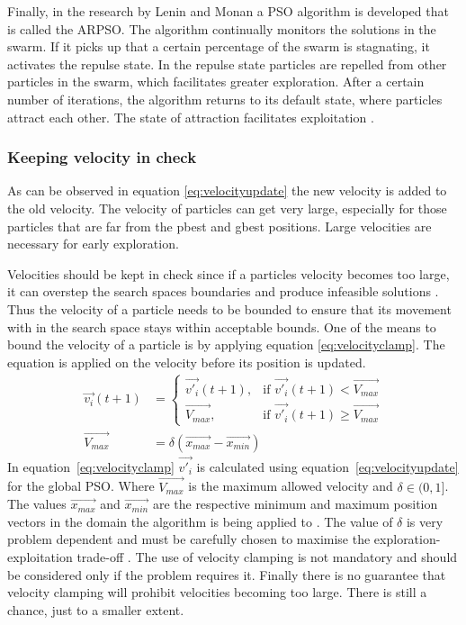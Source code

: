 Finally, in the research by Lenin and Monan a \gls{PSO} algorithm is developed that is called the \gls{ARPSO}. The algorithm continually monitors the solutions in the swarm. If it picks up that a certain percentage of the swarm is stagnating, it activates the repulse state. In the repulse state particles are repelled from other particles in the swarm, which facilitates greater exploration. After a certain number of iterations, the algorithm returns to its default state, where particles attract each other. The state of attraction facilitates exploitation \cite{PSOAttractRepulse}.
\subsubsection{Keeping velocity in check}
As can be observed in equation \ref{eq:velocityupdate} the new velocity is added to the old velocity. The velocity of particles can get very large, especially for those particles that are far from the pbest and gbest positions. Large velocities are necessary for early exploration. 

Velocities should be kept in check since if a particles velocity becomes too large, it can overstep the search spaces boundaries and produce infeasible solutions \cite{FundamentalSwarm}. Thus the velocity of a particle needs to be bounded to ensure that its movement with in the search space stays within acceptable bounds. One of the means to bound the velocity of a particle is by applying equation \ref{eq:velocityclamp}. The equation is applied on the velocity before its position is updated\cite{FundamentalSwarm}.
\begin{align}
	\vec{v_i}(t+1) &=
	\begin{cases}
	\vec{v'_i}(t+1), &\text{if $\vec{v'_i}(t+1) < \vec{V_{max}}$}\\
	\vec{V_{max}}, &\text{if $\vec{v'_i}(t+1) \geq \vec{V_{max}}$}
	\end{cases} \label{eq:velocityclamp}\\
	\vec{V_{max}} &= \delta(\vec{x_{max}} - \vec{x_{min}})
\end{align}
In equation~\ref{eq:velocityclamp} $\vec{v'_i}$ is calculated using equation~\ref{eq:velocityupdate} for the global \gls{PSO}. Where $\vec{V_{max}}$ is the maximum allowed velocity and $\delta \in (0,1]$. The values $\vec{x_{max}}$ and $\vec{x_{min}}$ are the respective minimum and maximum position vectors in the domain the algorithm is being applied to \cite{FundamentalSwarm}. The value of $\delta$ is very problem dependent and must be carefully chosen to maximise the exploration-exploitation trade-off \cite{FundamentalSwarm}. The use of velocity clamping is not mandatory and should be considered only if the problem requires it\cite{FundamentalSwarm}. Finally there is no guarantee that velocity clamping will prohibit velocities becoming too large\cite{FundamentalSwarm}. There is still a chance, just to a smaller extent\cite{FundamentalSwarm}.

